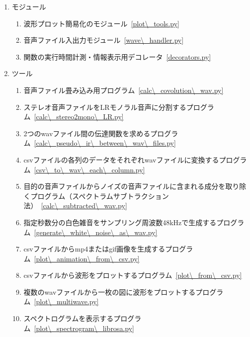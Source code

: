 \begin{enumerate}
\renewcommand{\labelenumi}{(\arabic{enumi})}
\item
  モジュール

  \begin{enumerate}
  \renewcommand{\labelenumi}{(\arabic{enumi})}
  \item
    波形プロット簡易化のモジュール\ \ref{plot\_tools.py}

  \item
    音声ファイル入出力モジュール\  \ref{wave\_handler.py}

  \item
    関数の実行時間計測・情報表示用デコレータ\ \ref{decorators.py}

  \end{enumerate}

\item
  ツール

  \begin{enumerate}
  \renewcommand{\labelenumi}{(\arabic{enumi})}
  \item
    音声ファイル畳み込み用プログラム\ \ref{calc\_covolution\_wav.py}

  \item
    ステレオ音声ファイルをLRモノラル音声に分割するプログラム\ \ref{calc\_stereo2mono\_LR.py}

  \item
    2つのwavファイル間の伝達関数を求めるプログラム\ \ref{calc\_pseudo\_ir\_between\_wav\_files.py}

  \item
    csvファイルの各列のデータをそれぞれwavファイルに変換するプログラム\ \ref{csv\_to\_wav\_each\_column.py}

  \item
    目的の音声ファイルからノイズの音声ファイルに含まれる成分を取り除くプログラム（スペクトラムサブトラクション法）\ \ref{calc\_subtracted\_wav.py}

  \item
    指定秒数分の白色雑音をサンプリング周波数48kHzで生成するプログラム\ \ref{generate\_white\_noise\_as\_wav.py}

  \item
    csvファイルからmp4またはgif画像を生成するプログラム\ \ref{plot\_animation\_from\_csv.py}

  \item
    csvファイルから波形をプロットするプログラム\ \ref{plot\_from\_csv.py}

  \item
    複数のwavファイルから一枚の図に波形をプロットするプログラム\ \ref{plot\_multiwave.py}

  \item
    スペクトログラムを表示するプログラム\ \ref{plot\_spectrogram\_librosa.py}

  \end{enumerate}
\end{enumerate}

